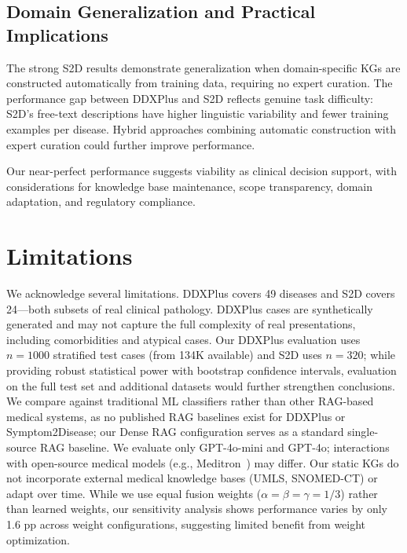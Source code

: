 \documentclass[preprint,12pt]{elsarticle}
\begin{document}
\subsection{Domain Generalization and Practical Implications}

The strong S2D results demonstrate generalization when domain-specific KGs are constructed automatically from training data, requiring no expert curation. The performance gap between DDXPlus and S2D reflects genuine task difficulty: S2D's free-text descriptions have higher linguistic variability and fewer training examples per disease. Hybrid approaches combining automatic construction with expert curation could further improve performance.

Our near-perfect performance suggests viability as clinical decision support, with considerations for knowledge base maintenance, scope transparency, domain adaptation, and regulatory compliance.

\section{Limitations}
\label{sec:limitations}

We acknowledge several limitations. DDXPlus covers 49 diseases and S2D covers 24---both subsets of real clinical pathology. DDXPlus cases are synthetically generated and may not capture the full complexity of real presentations, including comorbidities and atypical cases. Our DDXPlus evaluation uses $n{=}1000$ stratified test cases (from 134K available) and S2D uses $n{=}320$; while providing robust statistical power with bootstrap confidence intervals, evaluation on the full test set and additional datasets would further strengthen conclusions. We compare against traditional ML classifiers rather than other RAG-based medical systems, as no published RAG baselines exist for DDXPlus or Symptom2Disease; our Dense RAG configuration serves as a standard single-source RAG baseline. We evaluate only GPT-4o-mini and GPT-4o; interactions with open-source medical models (e.g., Meditron~\cite{chen2023meditron}) may differ. Our static KGs do not incorporate external medical knowledge bases (UMLS, SNOMED-CT) or adapt over time. While we use equal fusion weights ($\alpha{=}\beta{=}\gamma{=}1/3$) rather than learned weights, our sensitivity analysis shows performance varies by only 1.6 pp across weight configurations, suggesting limited benefit from weight optimization.
\end{document}
